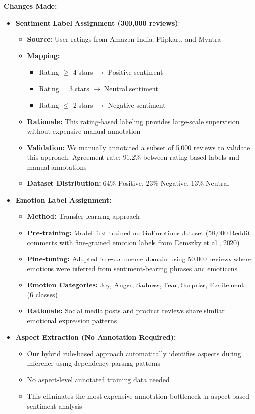 \documentclass[11pt,a4paper]{article}
\begin{document}
\textbf{Changes Made:}
\begin{itemize}[leftmargin=*]
    \item \textbf{Sentiment Label Assignment (300,000 reviews):}
    \begin{itemize}
        \item \textbf{Source:} User ratings from Amazon India, Flipkart, and Myntra
        \item \textbf{Mapping:}
        \begin{itemize}
            \item Rating $\geq$ 4 stars $\rightarrow$ Positive sentiment
            \item Rating = 3 stars $\rightarrow$ Neutral sentiment
            \item Rating $\leq$ 2 stars $\rightarrow$ Negative sentiment
        \end{itemize}
        \item \textbf{Rationale:} This rating-based labeling provides large-scale supervision without expensive manual annotation
        \item \textbf{Validation:} We manually annotated a subset of 5,000 reviews to validate this approach. Agreement rate: 91.2\% between rating-based labels and manual annotations
        \item \textbf{Dataset Distribution:} 64\% Positive, 23\% Negative, 13\% Neutral
    \end{itemize}
    
    \item \textbf{Emotion Label Assignment:}
    \begin{itemize}
        \item \textbf{Method:} Transfer learning approach
        \item \textbf{Pre-training:} Model first trained on GoEmotions dataset (58,000 Reddit comments with fine-grained emotion labels from Demszky et al., 2020)
        \item \textbf{Fine-tuning:} Adapted to e-commerce domain using 50,000 reviews where emotions were inferred from sentiment-bearing phrases and emoticons
        \item \textbf{Emotion Categories:} Joy, Anger, Sadness, Fear, Surprise, Excitement (6 classes)
        \item \textbf{Rationale:} Social media posts and product reviews share similar emotional expression patterns
    \end{itemize}
    
    \item \textbf{Aspect Extraction (No Annotation Required):}
    \begin{itemize}
        \item Our hybrid rule-based approach automatically identifies aspects during inference using dependency parsing patterns
        \item No aspect-level annotated training data needed
        \item This eliminates the most expensive annotation bottleneck in aspect-based sentiment analysis
    \end{itemize}
    

\end{itemize}
\end{document}
